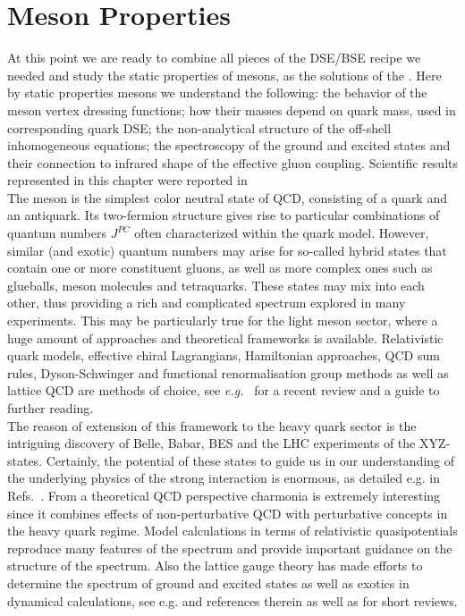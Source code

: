 \chapter{Meson Properties}
\label{chap:spectra}

At this point we are ready to combine all pieces of the DSE/BSE recipe we needed and study the static %
properties of mesons, as the solutions of the \BSE. Here by static properties mesons we understand the following: the behavior of the meson vertex dressing functions; how their masses depend on quark mass, used in corresponding quark DSE; the non-analytical structure of the off-shell inhomogeneous \BS equations; the spectroscopy of the ground and excited states and their connection to infrared shape of the effective gluon coupling. Scientific results represented in this chapter were reported in \cite{Fischer:2014xha,Fischer:2014cfa} \\

The meson is the simplest color neutral state of QCD, consisting of a quark and an antiquark. Its two-fermion structure gives rise to particular combinations of quantum numbers $J^{PC}$ often characterized within 
the quark model. However, similar (and exotic) quantum numbers may arise for so-called hybrid states 
that contain one or more constituent gluons, as well as more complex ones such as glueballs, 
meson molecules and tetraquarks. These states may mix into each other, thus providing a rich and 
complicated spectrum explored in many experiments. This may be particularly true for the light meson sector, where a huge amount of approaches and theoretical frameworks is available. Relativistic quark models, effective chiral Lagrangians, Hamiltonian
approaches, QCD sum rules, Dyson-Schwinger and functional renormalisation group methods as well as 
lattice QCD are methods of choice, see \emph{e.g.}~\cite{Brambilla:2014aaa} for a recent review and a guide 
to further reading. \\

The reason of extension of this framework to the heavy quark sector is the intriguing discovery of Belle, Babar, BES and the LHC experiments of the XYZ-states. Certainly, the potential of these states to guide us in our understanding of the underlying physics of the strong interaction is enormous, as detailed e.g. in Refs.~\cite{Brambilla:2010cs,Pakhlova:2010zza,JohanMesschendorpfortheBESIII:2013vla,Bodwin:2013nua}. From a theoretical QCD perspective charmonia is extremely interesting since it combines effects of non-perturbative QCD with perturbative concepts in the heavy quark regime. Model calculations in terms of relativistic quasipotentials reproduce many features of the spectrum
\cite{Godfrey:1985xj,Ebert:2002pp,Ebert:2011jc,LlanesEstrada:2011kc} and provide important
guidance on the structure of the spectrum. Also the lattice gauge theory has made efforts to determine the spectrum of ground and excited states
as well as exotics in dynamical calculations, see e.g. \cite{Namekawa:2011wt,Bali:2011rd,Liu:2012ze,Moir:2013ub,Kalinowski:2013wsa}
and references therein as well as \cite{Mohler:2012gn,Prelovsek:2013cta} for short reviews. \\

